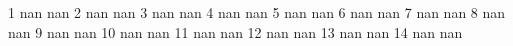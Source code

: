 1 nan nan
2 nan nan
3 nan nan
4 nan nan
5 nan nan
6 nan nan
7 nan nan
8 nan nan
9 nan nan
10 nan nan
11 nan nan
12 nan nan
13 nan nan
14 nan nan
